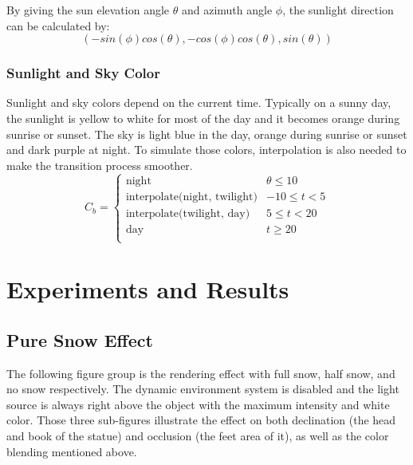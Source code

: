 \documentclass{article}
\begin{document}
By giving the sun elevation angle \( \theta \) and azimuth angle \( \phi \), the sunlight direction
can be calculated by:
\[
  (-sin(\phi)cos(\theta), -cos(\phi)cos(\theta), sin(\theta))
\]

\subsubsection {Sunlight and Sky Color}
Sunlight and sky colors depend on the current time. Typically on a sunny day, the sunlight is yellow
to white for most of the day and it becomes orange during sunrise or sunset. The sky is light blue
in the day, orange during sunrise or sunset and dark purple at night. To simulate those colors, 
interpolation is also needed to make the transition process smoother. 
\[
  C_{b}=
  \left\{
    \begin{array}{ll}
      \text{night} & \theta \leq 10 \\
      \text{interpolate(night, twilight)} &  -10 \leq t < 5 \\
      \text{interpolate(twilight, day)} &  5 \leq t < 20 \\
      \text{day} & t \geq 20 \\
    \end{array} 
  \right. 
\]

\section{Experiments and Results}

\subsection {Pure Snow Effect}
The following figure group is the rendering effect with full snow, half snow, and no snow respectively.
The dynamic environment system is disabled and the light source is always right above the object with
the maximum intensity and white color. Those three sub-figures illustrate the effect on both declination 
(the head and book of the statue) and occlusion (the feet area of it), as well as the color blending
mentioned above.
\end{document}
